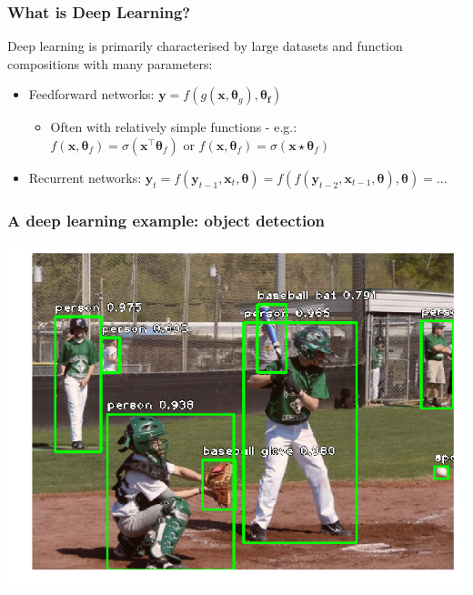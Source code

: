 \documentclass[\beamerclass,aspectratio=1610]{beamer}
\begin{document}
\begin{frame}
\frametitle{What is Deep Learning?}

Deep learning is primarily characterised by large datasets and function compositions with many parameters: \\ \vspace{10mm}
\begin{itemize}
	\item<2-> Feedforward networks: $\bm{y} = f (g(\bm{x}, \bm\theta_g), \bm{\theta_f})$
	\begin{itemize}
		\item Often with relatively simple functions - e.g.:\\
		$f(\bm x, \bm{\theta}_f) = \sigma(\bm{x}^\top \bm{\theta}_f)$ or $f(\bm x, \bm{\theta}_f) = \sigma(\bm{x} \star \bm{\theta}_f)$
	\end{itemize} \vspace{3mm}
	\item<3-> Recurrent networks: $\bm y_t = f(\bm y_{t-1}, \bm x_t, \bm\theta) = f(f(\bm y_{t-2}, \bm x_{t-1}, \bm\theta), \bm\theta) = \dots$
\end{itemize}
\vspace{10mm}

\end{frame}

\begin{frame}
\frametitle{A deep learning example: object detection}
\centering
\includegraphics[scale=0.55]{coco2.png}
\end{frame}
\end{document}
